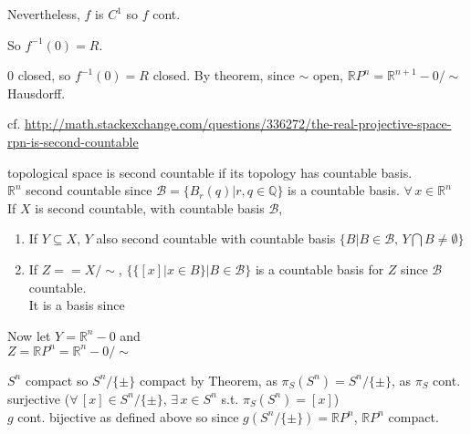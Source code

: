 Nevertheless, $f$ is $C^1$ so $f$ cont.  

So $f^{-1}(0) = R$. 

$0$ closed, so $f^{-1}(0) = R$ closed.  By theorem, since $\sim$ open, $\mathbb{R}P^n = \mathbb{R}^{n+1} - 0 / \sim$ Hausdorff.  

cf. \url{http://math.stackexchange.com/questions/336272/the-real-projective-space-rpn-is-second-countable}

topological space is second countable if its topology has countable basis.  \\
\quad $\mathbb{R}^n$ second countable since $\mathcal{B} = \lbrace B_r{ ( q)} | r,q \in \mathbb{Q} \rbrace$ is a countable basis.  $\forall \, x \in \mathbb{R}^n$ \\

If $X$ is second countable, with countable basis $\mathcal{B}$, 
\begin{enumerate}
\item If $Y \subseteq X$, $Y$ also second countable with countable basis $\lbrace B | B \in \mathcal{B}, \, Y \bigcap B \neq \emptyset \rbrace$
\item If $Z == X/\sim $, $\lbrace \lbrace [x] | x \in B \rbrace | B \in \mathcal{B} \rbrace$ is a countable basis for $Z$ since $\mathcal{B}$ countable.  \\

It is a basis since 



\end{enumerate}

Now let $Y = \mathbb{R}^n-0$ and \\
\phantom{Now let } $Z = \mathbb{R}P^n = \mathbb{R}^n-0 / \sim$


$S^n$ compact so $S^n/\lbrace \pm \rbrace$ compact by Theorem, as $\pi_S(S^n) = S^n/ \lbrace \pm \rbrace$, as $\pi_S$ cont. surjective ($\forall \, [x] \in S^n/\lbrace \pm \rbrace$, $\exists \, x \in S^n$ s.t. $\pi_S(S^n) = [x]$) \\
$g$ cont. bijective as defined above so since $g(S^n/\lbrace \pm \rbrace) = \mathbb{R}P^n$, $\mathbb{R}P^n$ compact.  


